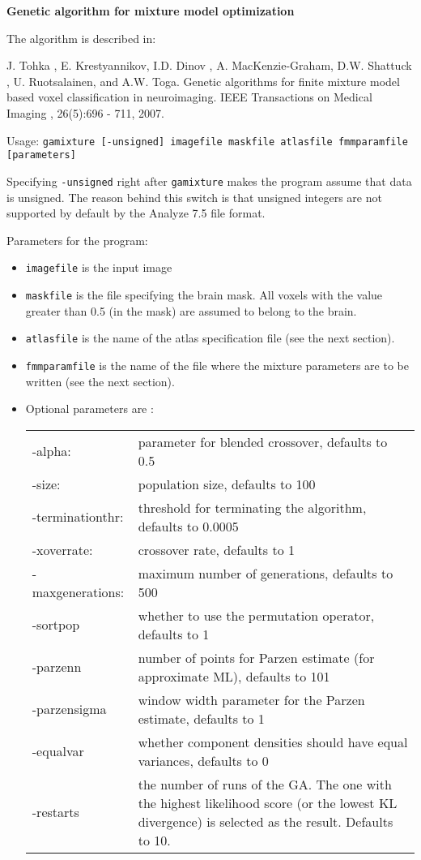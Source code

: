 \documentclass[12pt]{article}
\begin{document}
{\bf Genetic algorithm for mixture model optimization}

The algorithm is described in: 

J. Tohka , E. Krestyannikov, I.D. Dinov , A. MacKenzie-Graham,
 D.W. Shattuck , U. Ruotsalainen, and A.W. Toga. 
 Genetic algorithms for finite mixture model based voxel classification
 in neuroimaging.  
 IEEE Transactions on Medical Imaging  , 26(5):696 - 711, 2007. 

Usage: {\tt gamixture [-unsigned] imagefile maskfile atlasfile fmmparamfile [parameters]}

Specifying {\tt -unsigned} right after {\tt gamixture} makes the program assume that data is unsigned. The reason behind this switch is that unsigned 
integers are not supported by default by the Analyze 7.5 file format.

Parameters for the program:

\begin{itemize}

\item {\tt imagefile} is the input image

\item {\tt maskfile} is the file specifying the brain mask. All voxels with the
value greater than 0.5 (in the mask) are assumed to belong to the brain.

\item {\tt atlasfile} is the name of the atlas specification file (see the next
section).

\item {\tt fmmparamfile} is the name of the file where the mixture parameters are
to be written (see the next section).

\item Optional parameters are : \\
\begin{tabular}{l p{10cm}}
-alpha:      &       parameter for blended crossover, defaults to 0.5 \\
-size:       &       population size, defaults to 100 \\
-terminationthr: &   threshold for terminating the algorithm, defaults
to 0.0005 \\
-xoverrate:   &      crossover rate, defaults to 1 \\
-maxgenerations: &   maximum number of generations, defaults to 500 \\
-sortpop         &   whether to use the permutation operator, defaults
to 1 \\
-parzenn        &    number of points for Parzen estimate (for
approximate ML), defaults to 101 \\
-parzensigma   &     window width parameter for the Parzen estimate,
defaults to 1 \\
-equalvar      &     whether component densities should have equal
variances, defaults to 0 \\
-restarts      &     the number of runs of the GA. The one with the
highest likelihood score (or the lowest KL divergence) is selected as
the result. Defaults to 10. \\
\end{tabular}
\end{itemize}
\end{document}
